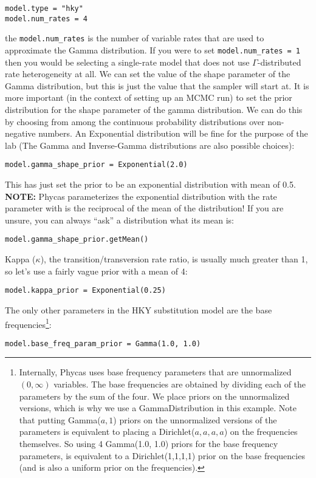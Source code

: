 \documentclass{article}
\newcommand{\cmd}[1]{\texttt{#1}\xspace}
\newcommand{\phycas}{Phycas\xspace}
\begin{document}
\begin{verbatim}
model.type = "hky"
model.num_rates = 4
\end{verbatim}
the \cmd{model.num\_rates} is the number of variable rates that are used to approximate the Gamma distribution. 
If you were to set \cmd{model.num\_rates = 1} then you would be selecting a single-rate model that does not use $\Gamma$-distributed rate heterogeneity at all.
We can set the value of the shape parameter of the Gamma distribution, but this is just the value that the sampler will start at.  
It is more important (in the context of setting up an MCMC run) to set the prior distribution for the  shape parameter of the gamma distribution.
We can do this by choosing from among the continuous probability distributions over non-negative numbers.
An Exponential distribution will be fine for the purpose of the lab (The Gamma and Inverse-Gamma distributions are also possible choices):
\begin{verbatim}
model.gamma_shape_prior = Exponential(2.0)
\end{verbatim}
This has just set the prior to be an exponential distribution with mean of 0.5.
\\{\bf NOTE:}  \phycas parameterizes the exponential distribution with the rate parameter with is the reciprocal of the mean of the distribution!
If you are unsure, you can always ``ask'' a distribution what its mean is:
\begin{verbatim}
model.gamma_shape_prior.getMean()
\end{verbatim}


Kappa ($\kappa$), the transition/transversion rate ratio, is usually much greater than 1, so let's use a fairly vague prior with a mean of 4:
\begin{verbatim}
model.kappa_prior = Exponential(0.25)
\end{verbatim}

The only other parameters in the HKY substitution model are the base frequencies\footnote{
Internally, \phycas uses base frequency parameters that are unnormalized $(0,\infty)$ variables.
The base frequencies are obtained by dividing each of the parameters by the sum of the four.
We place priors on the unnormalized versions, which is why we use a GammaDistribution in this example.
Note that putting Gamma($a,1$) priors on the unnormalized versions of the parameters is 
equivalent to placing a Dirichlet($a,a,a,a$) on the frequencies themselves.
So using 4 Gamma(1.0, 1.0) priors for the base frequency parameters, is equivalent to a Dirichlet(1,1,1,1)
prior on the base frequencies (and is also a uniform prior on the frequencies).
}:
\begin{verbatim}
model.base_freq_param_prior = Gamma(1.0, 1.0)
\end{verbatim}
\end{document}
